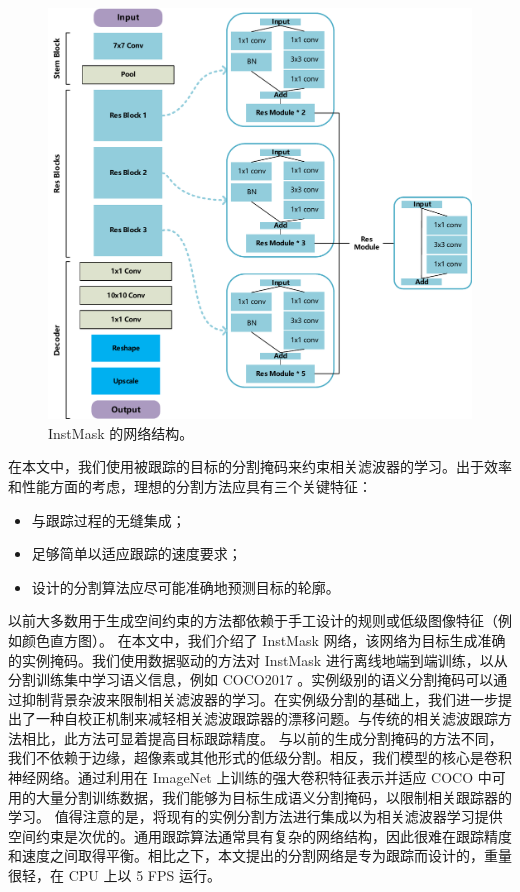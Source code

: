 \begin{figure}[t]
    \centering
    \includegraphics[width=1.0\textwidth]{Img/IGCF/net.pdf}
    \caption{InstMask 的网络结构。}
    \label{fig:net}
\end{figure}

在本文中，我们使用被跟踪的目标的分割掩码来约束相关滤波器的学习。出于效率和性能方面的考虑，理想的分割方法应具有三个关键特征：

\begin{itemize}
\item 与跟踪过程的无缝集成；
\item 足够简单以适应跟踪的速度要求；
\item 设计的分割算法应尽可能准确地预测目标的轮廓。
\end{itemize}

以前大多数用于生成空间约束的方法都依赖于手工设计的规则或低级图像特征（例如颜色直方图）。
在本文中，我们介绍了 InstMask 网络，该网络为目标生成准确的实例掩码。我们使用数据驱动的方法对 InstMask 进行离线地端到端训练，以从分割训练集中学习语义信息，例如 COCO2017 \cite{COCO}。实例级别的语义分割掩码可以通过抑制背景杂波来限制相关滤波器的学习。在实例级分割的基础上，我们进一步提出了一种自校正机制来减轻相关滤波跟踪器的漂移问题。与传统的相关滤波跟踪方法相比，此方法可显着提高目标跟踪精度。
与以前的生成分割掩码的方法不同，我们不依赖于边缘，超像素或其他形式的低级分割。相反，我们模型的核心是卷积神经网络。通过利用在 ImageNet \cite{ImageNet} 上训练的强大卷积特征表示并适应 COCO 中可用的大量分割训练数据，我们能够为目标生成语义分割掩码，以限制相关跟踪器的学习。
值得注意的是，将现有的实例分割方法进行集成以为相关滤波器学习提供空间约束是次优的。通用跟踪算法通常具有复杂的网络结构，因此很难在跟踪精度和速度之间取得平衡。相比之下，本文提出的分割网络是专为跟踪而设计的，重量很轻，在 CPU 上以 5 FPS 运行。

